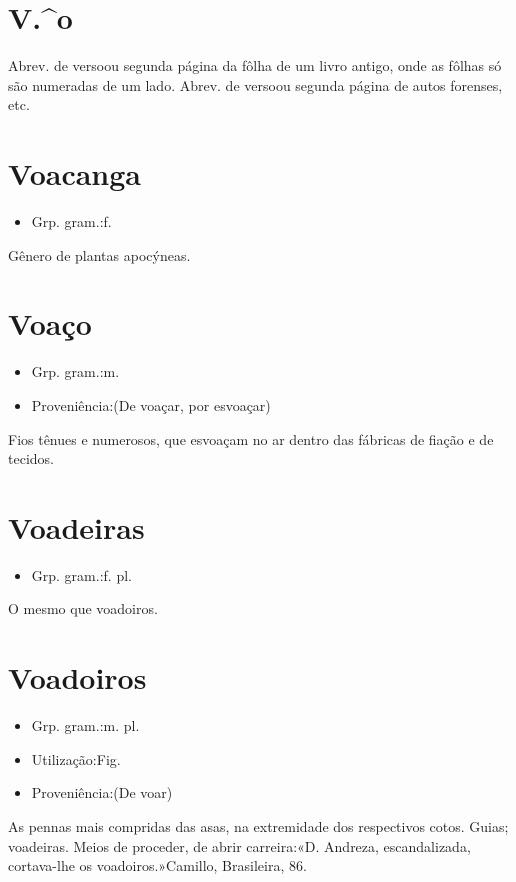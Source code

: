\documentclass{article}
\begin{document}
\section{V.^o}
Abrev. de \textunderscore verso\textunderscore  ou segunda página da fôlha de um livro antigo, onde as fôlhas só são numeradas de um lado.
Abrev. de \textunderscore verso\textunderscore  ou segunda página de autos forenses, etc.
\section{Voacanga}
\begin{itemize}
\item {Grp. gram.:f.}
\end{itemize}
Gênero de plantas apocýneas.
\section{Voaço}
\begin{itemize}
\item {Grp. gram.:m.}
\end{itemize}
\begin{itemize}
\item {Proveniência:(De \textunderscore voaçar\textunderscore , por \textunderscore esvoaçar\textunderscore )}
\end{itemize}
Fios tênues e numerosos, que esvoaçam no ar dentro das fábricas de fiação e de tecidos.
\section{Voadeiras}
\begin{itemize}
\item {Grp. gram.:f. pl.}
\end{itemize}
O mesmo que \textunderscore voadoiros\textunderscore .
\section{Voadoiros}
\begin{itemize}
\item {Grp. gram.:m. pl.}
\end{itemize}
\begin{itemize}
\item {Utilização:Fig.}
\end{itemize}
\begin{itemize}
\item {Proveniência:(De \textunderscore voar\textunderscore )}
\end{itemize}
As pennas mais compridas das asas, na extremidade dos respectivos cotos.
Guias; voadeiras.
Meios de proceder, de abrir carreira:«\textunderscore D. Andreza, escandalizada, cortava-lhe os voadoiros.\textunderscore »Camillo, \textunderscore Brasileira\textunderscore , 86.
\end{document}
